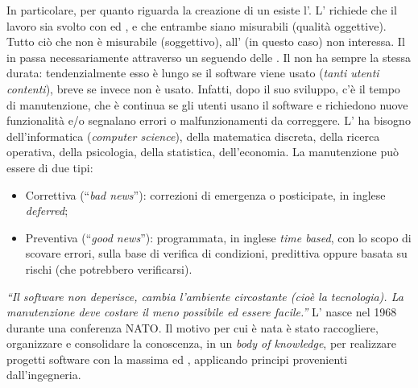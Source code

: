 \documentclass[../main.tex]{subfiles}
\begin{document}
In particolare, per quanto riguarda la creazione di un  esiste l’. L’ richiede che il lavoro sia svolto con  ed , e che entrambe siano misurabili (qualità oggettive). Tutto ciò che non è misurabile (soggettivo), all’ (in questo caso) non interessa.\newline\newline
Il  in  passa necessariamente attraverso un  seguendo delle . Il  non ha sempre la stessa durata: tendenzialmente esso è lungo se il software viene usato (\textit{tanti utenti contenti}), breve se invece non è usato. Infatti, dopo il suo sviluppo, c’è il tempo di manutenzione, che è continua se gli utenti usano il software e richiedono nuove funzionalità e/o segnalano errori o malfunzionamenti da correggere.\newline\newline
L’ ha bisogno dell’informatica (\textit{computer science}), della matematica discreta, della ricerca operativa, della psicologia, della statistica, dell’economia.\newline\newline
La manutenzione può essere di due tipi:
\begin{itemize}
    \item Correttiva (“\textit{bad news}”): correzioni di emergenza o posticipate, in inglese \textit{deferred};
    \item Preventiva (“\textit{good news}”): programmata, in inglese \textit{time based}, con lo scopo di scovare errori, sulla base di verifica di condizioni, predittiva oppure basata su rischi (che potrebbero verificarsi).
\end{itemize}
\textit{“Il software non deperisce, cambia l’ambiente circostante (cioè la tecnologia). La manutenzione deve costare il meno possibile ed essere facile.”}\newline\newline
L’ nasce nel 1968 durante una conferenza NATO. Il motivo per cui è nata è stato raccogliere, organizzare e consolidare la conoscenza, in un \textit{body of knowledge}, per realizzare progetti software con la massima  ed , applicando principi provenienti dall’ingegneria.\newline\newline
\end{document}
